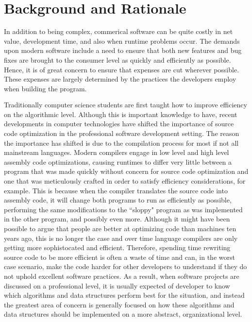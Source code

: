 \documentclass[12pt, letterpaper]{article}
\begin{document}
\section{Background and Rationale}
  In addition to being complex, commerical software can be quite costly in net value, development time, and also when runtime problems occur.
  The demands upon modern software include a need to ensure that both new features and bug fixes are brought to the consumer level as quickly and efficiently as possible. Hence, it is of great
  concern to ensure that expenses are cut wherever possible. These expenses are largely determined by the practices the developers employ when building the program.
  \par Traditionally computer science students are first taught how to improve efficiency on the algorithmic level. Although this is important knowledge to have, recent developments in
  computer technologies have shifted the importance of source code optimization in the professional software development setting. The reason the importance has shifted is due to the compilation process for most if not all mainstream
  languages. Modern compilers engage in low level and high level assembly code optimizations, causing runtimes to differ very little between a program that was made quickly without concern for source code
  optimization and one that was meticulously crafted in order to satisfy efficiency considerations, for example. This is because when the compiler translates the source code into assembly code, it will change both programs to run as efficiently as possible, performing the same modifications to the ``sloppy" program as was implemented in the other program, and possibly even more. Although it might have been possible to argue that people are better at optimizing code than machines ten years ago, this is no longer the case and over time language compilers are only getting more sophistocated and efficient.
  Therefore, spending time rewriting source code to be more efficient is often a waste of time and can, in the worst case scenario, make the code harder for other developers to understand if they do not uphold excellent software practices. As a result, when software projects are
  discussed on a professional level, it is usually expected of developer to know which algorithms and data structures perform best for the situation, and instead the greatest area of concern is
  generally focused on how these algorithms and data structures should be implemented on a more abstract, organizational level.
\end{document}
